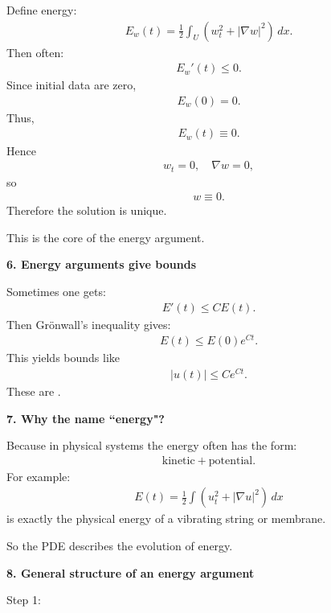 \documentclass[12pt,a4paper]{report}
\begin{document}
\begin{description}
\begin{description}
Define energy:
\begin{align*}
E_w(t)=\frac12\int_U (w_t^2+|\nabla w|^2)\,dx.
\end{align*}
Then often:
\begin{align*}
E_w'(t)\le 0.
\end{align*}
Since initial data are zero,
\begin{align*}
E_w(0)=0.
\end{align*}
Thus,
\begin{align*}
E_w(t)\equiv 0.
\end{align*}
Hence
\begin{align*}
w_t=0,\quad \nabla w=0,
\end{align*}
so
\begin{align*}
w\equiv 0.
\end{align*}
Therefore the solution is unique.

This is the core of the energy argument.

\item \textbf{6. Energy arguments give bounds}

Sometimes one gets:
\begin{align*}
E'(t)\le CE(t).
\end{align*}
Then Grönwall's inequality gives:
\begin{align*}
E(t)\le E(0)e^{Ct}.
\end{align*}
This yields bounds like
\begin{align*}
|u(t)|\le Ce^{Ct}.
\end{align*}
These are .

\item \textbf{7. Why the name ``energy"?}

Because in physical systems the energy often has the form:
\begin{align*}
\text{kinetic}+\text{potential}.
\end{align*}
For example:
\begin{align*}
E(t)=\frac12\int (u_t^2+|\nabla u|^2)\,dx
\end{align*}
is exactly the physical energy of a vibrating string or membrane.

So the PDE describes the evolution of energy.

\item \textbf{8. General structure of an energy argument}

\begin{description}

    \item Step 1:


\end{description}
\end{description}
\end{description}
\end{document}
